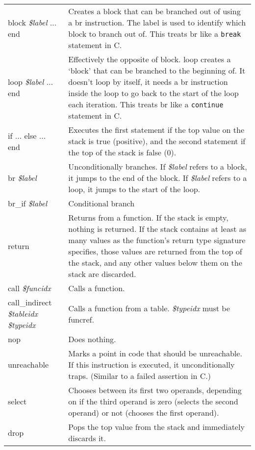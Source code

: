 \documentclass[10pt,a4paper]{article}
\begin{document}
\begin{xltabular}{\textwidth}{>{\sffamily}lX}
\toprule
block \normalfont\textit{\$label} $\ldots$ end & Creates a block that can be branched out of using a \textsf{br} instruction. The label is used to identify which block to branch out of. This treats \textsf{br} like a \texttt{break} statement in C. \\
loop \normalfont\textit{\$label} $\ldots$ end & Effectively the opposite of \textsf{block}. \textsf{loop} creates a `block' that can be branched to the beginning of. It doesn't loop by itself, it needs a \textsf{br} instruction inside the loop to go back to the start of the loop each iteration. This treats \textsf{br} like a \texttt{continue} statement in C. \\
if $\ldots$ else $\ldots$ end & Executes the first statement if the top value on the stack is true (positive), and the second statement if the top of the stack is false (0). \\
br \normalfont\textit{\$label} & Unconditionally branches. If \textit{\$label} refers to a block, it jumps to the end of the block. If \textit{\$label} refers to a loop, it jumps to the start of the loop. \\
br\_if \normalfont\textit{\$label} & Conditional branch \\
return & Returns from a function. If the stack is empty, nothing is returned. If the stack contains at least as many values as the function's return type signature specifies, those values are returned from the top of the stack, and any other values below them on the stack are discarded. \\
call \normalfont\textit{\$funcidx} & Calls a function. \\
call\_indirect \normalfont\textit{\$tableidx \$typeidx} & Calls a function from a table. \textit{\$typeidx} must be \textsf{funcref}. \\
nop & Does nothing. \\
unreachable & Marks a point in code that should be unreachable. If this instruction is executed, it unconditionally traps. (Similar to a failed assertion in C.) \\
select & Chooses between its first two operands, depending on if the third operand is zero (selects the second operand) or not (chooses the first operand). \\
drop & Pops the top value from the stack and immediately discards it. \\
\bottomrule
\end{xltabular}
\end{document}

